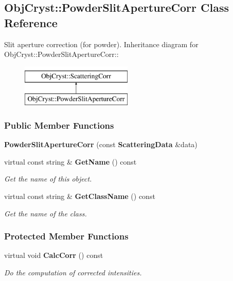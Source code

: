 \subsection{ObjCryst::PowderSlitApertureCorr Class Reference}
\label{a00066}


Slit aperture correction (for powder).  
Inheritance diagram for ObjCryst::PowderSlitApertureCorr::\begin{figure}[H]
\begin{center}
\leavevmode
\includegraphics[height=2cm]{a00066}
\end{center}
\end{figure}
\subsubsection*{Public Member Functions}
\begin{DoxyCompactItemize}
\item 
{\bfseries PowderSlitApertureCorr} (const {\bf ScatteringData} \&data)\label{a00066_a8c7814fd23c9e2fe96a904ea41137caf}

\item 
virtual const string \& {\bf GetName} () const \label{a00066_a395cb337777d1c3fdd283f03c9a06e27}

\begin{DoxyCompactList}\small\item\em Get the name of this object. \item\end{DoxyCompactList}\item 
virtual const string \& {\bf GetClassName} () const \label{a00066_a36c1dd123d3f951ba140796f47a68fbb}

\begin{DoxyCompactList}\small\item\em Get the name of the class. \item\end{DoxyCompactList}\end{DoxyCompactItemize}
\subsubsection*{Protected Member Functions}
\begin{DoxyCompactItemize}
\item 
virtual void {\bf CalcCorr} () const \label{a00066_ae7b2fecebc30de79ccc54f5237ec67f7}

\begin{DoxyCompactList}\small\item\em Do the computation of corrected intensities. \item\end{DoxyCompactList}\end{DoxyCompactItemize}


